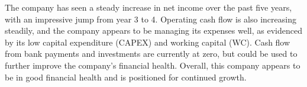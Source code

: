 

The company has seen a steady increase in net income over the past five years, with an impressive jump from year 3 to 4. Operating cash flow is also increasing steadily, and the company appears to be managing its expenses well, as evidenced by its low capital expenditure (CAPEX) and working capital (WC). Cash flow from bank payments and investments are currently at zero, but could be used to further improve the company's financial health. Overall, this company appears to be in good financial health and is positioned for continued growth.